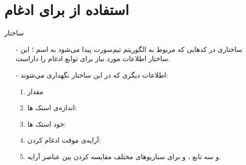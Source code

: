 \section{استفاده از  برای ادغام}
\begin{frame}{ساختار }
\begin{itemize}\itemr
\item[-]
ساختاری در کد‌هایی که مربوط به الگوریتم تیم‌سورت پیدا می‌شود به اسم ؛ این ساختار اطلاعات مورد نیاز برای توابع ادغام را داراست.

\item[-]
اطلاعات دیگری که در این ساختار نگهداری می‌شوند:
\begin{enumerate}\itemr
\item 
مقدار 

\item 
اندازه‌ی استک ها:

\item 
خود استک ها:

\item 
آرایه‌ی موقت ادغام کردن:

\item 
و سه تابع
،
 و
برای سناریو‌های مختلف مقایسه کردن بین عناصر آرایه.
\end{enumerate}
\end{itemize}
\end{frame}
